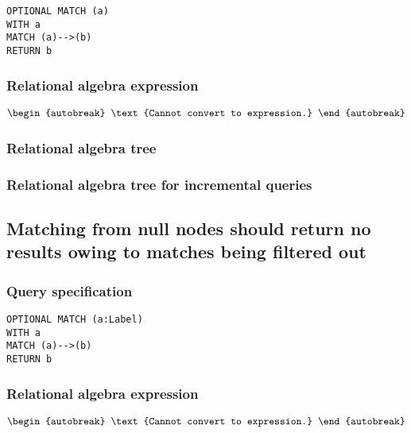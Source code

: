 \begin{lstlisting}
OPTIONAL MATCH (a)
WITH a
MATCH (a)-->(b)
RETURN b
\end{lstlisting}

\subsubsection*{Relational algebra expression}

\begin{align*}
\begin{autobreak}
\text{Cannot convert to expression.}
\end{autobreak}
\end{align*}

\subsubsection*{Relational algebra tree}


\subsubsection*{Relational algebra tree for incremental queries}


\subsection{Matching from null nodes should return no results owing to matches being filtered out}

\subsubsection*{Query specification}

\begin{lstlisting}
OPTIONAL MATCH (a:Label)
WITH a
MATCH (a)-->(b)
RETURN b
\end{lstlisting}

\subsubsection*{Relational algebra expression}

\begin{align*}
\begin{autobreak}
\text{Cannot convert to expression.}
\end{autobreak}
\end{align*}

